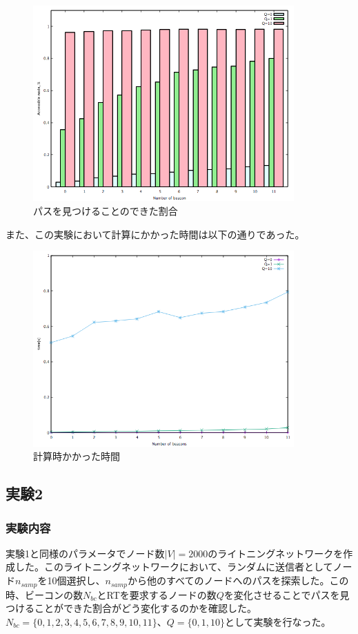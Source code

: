 \documentclass[12pt]{jarticle}
\begin{document}
\begin{figure}[h]
 \centering
   \includegraphics[width=100mm]{figures/ex1accessible.png}
 \caption{パスを見つけることのできた割合}
 \label{ans1f}
\end{figure}

また、この実験において計算にかかった時間は以下の通りであった。

\begin{figure}[h]
 \centering
   \includegraphics[width=100mm]{figures/avetime.png}
 \caption{計算時かかった時間}
 \label{time1}
\end{figure}

\subsection{実験2}
\subsubsection{実験内容}
実験1と同様のパラメータでノード数$|V|=2000$のライトニングネットワークを作成した。このライトニングネットワークにおいて、ランダムに送信者としてノード$n_{samp}$を10個選択し、$n_{samp}$から他のすべてのノードへのパスを探索した。この時、ビーコンの数$N_{bc}$とRTを要求するノードの数$Q$を変化させることでパスを見つけることができた割合がどう変化するのかを確認した。$N_{bc}=\{0,1,2,3,4,5,6,7,8,9,10,11\}$、$Q=\{0,1,10\}$として実験を行なった。
\end{document}
